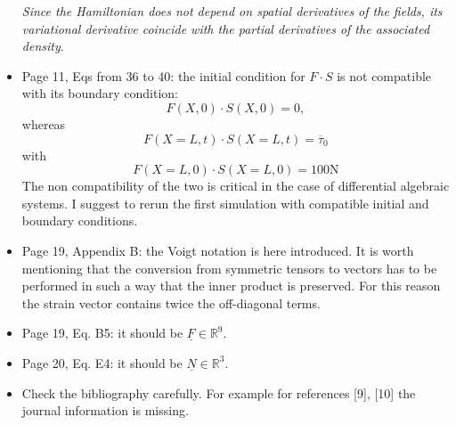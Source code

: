 \documentclass[a4paper, 10pt]{article}
\newcommand{\bbR}{\mathbb{R}}
\begin{document}
\begin{itemize}
		\textit{Since the Hamiltonian does not depend on spatial derivatives of the fields, its variational derivative coincide with the partial derivatives of the associated density}.
		\item Page 11, Eqs from  36 to 40: the initial condition for $F \cdot S$ is not compatible with its boundary condition:
		\begin{equation*}
			F(X, 0) \cdot S(X, 0) = 0,
		\end{equation*}	
	whereas
	\begin{equation*}
	 F(X=L, t) \cdot S(X=L, t) = \overline{\tau}_0
	\end{equation*}
	with
	\begin{equation*}
		F(X=L, 0) \cdot S(X=L, 0) = 100 \mathrm{N}
	\end{equation*}
	The non compatibility of the two is critical in the case of differential algebraic systems. I suggest to rerun the first simulation with compatible initial and boundary conditions.
	\item Page 19, Appendix B: the Voigt notation is here introduced. It is worth mentioning that the conversion from symmetric tensors to vectors has to be performed in such a way that the inner product is preserved. For this reason the strain vector contains twice the off-diagonal terms.
	\item Page 19, Eq. B5: it should be $\underline{F} \in \bbR^9$.
	\item Page 20, Eq. E4: it should be $\underline{N} \in \bbR^3$.
	\item Check the bibliography carefully. For example for references [9], [10] the journal information is missing.
	\end{itemize}
	
\end{document}
